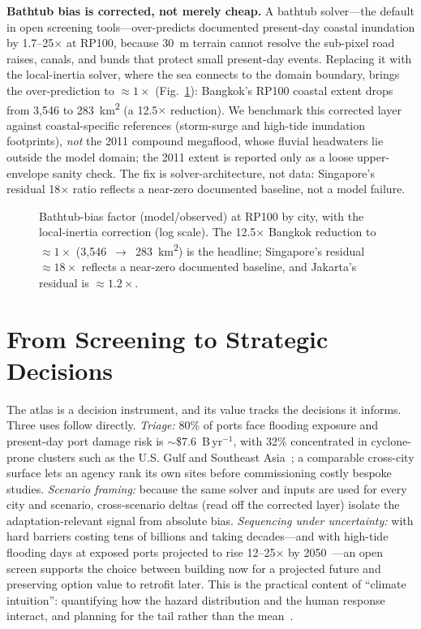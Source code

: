 \documentclass[conference]{IEEEtran}
\begin{document}
\textbf{Bathtub bias is corrected, not merely cheap.} A bathtub solver---the default in open screening tools---over-predicts documented present-day coastal inundation by 1.7--25$\times$ at RP100, because 30~m terrain cannot resolve the sub-pixel road raises, canals, and bunds that protect small present-day events. Replacing it with the local-inertia solver, where the sea connects to the domain boundary, brings the over-prediction to ${\approx}1\times$ (Fig.~\ref{fig:bias}): Bangkok's RP100 coastal extent drops from 3{,}546 to 283~km\textsuperscript{2} (a 12.5$\times$ reduction). We benchmark this corrected layer against coastal-specific references (storm-surge and high-tide inundation footprints), \emph{not} the 2011 compound megaflood, whose fluvial headwaters lie outside the model domain; the 2011 extent is reported only as a loose upper-envelope sanity check. The fix is solver-architecture, not data: Singapore's residual 18$\times$ ratio reflects a near-zero documented baseline, not a model failure.

\begin{figure}[t]
\centering
\caption{Bathtub-bias factor (model/observed) at RP100 by city, with the local-inertia correction (log scale). The 12.5$\times$ Bangkok reduction to ${\approx}1\times$ (3{,}546~$\rightarrow$~283~km\textsuperscript{2}) is the headline; Singapore's residual ${\approx}18\times$ reflects a near-zero documented baseline, and Jakarta's residual is ${\approx}1.2\times$.}
\label{fig:bias}
\end{figure}

\section{From Screening to Strategic Decisions}
The atlas is a decision instrument, and its value tracks the decisions it informs. Three uses follow directly. \emph{Triage:} 80\% of ports face flooding exposure and present-day port damage risk is $\sim$\$7.6~B\,yr$^{-1}$, with 32\% concentrated in cyclone-prone clusters such as the U.S. Gulf and Southeast Asia~\cite{verschuur2023}; a comparable cross-city surface lets an agency rank its own sites before commissioning costly bespoke studies. \emph{Scenario framing:} because the same solver and inputs are used for every city and scenario, cross-scenario deltas (read off the corrected layer) isolate the adaptation-relevant signal from absolute bias. \emph{Sequencing under uncertainty:} with hard barriers costing tens of billions and taking decades---and with high-tide flooding days at exposed ports projected to rise 12--25$\times$ by 2050~\cite{jpm_seachange}---an open screen supports the choice between building now for a projected future and preserving option value to retrofit later. This is the practical content of ``climate intuition'': quantifying how the hazard distribution and the human response interact, and planning for the tail rather than the mean~\cite{jpm_intuition}.
\end{document}
